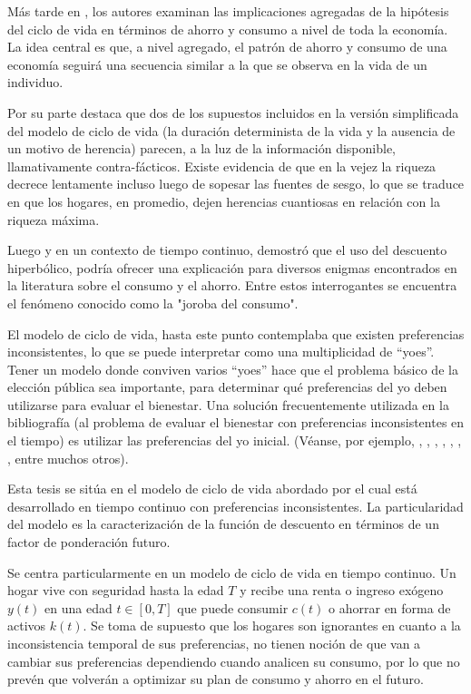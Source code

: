Más tarde en \parencite{ando1963life}, los autores examinan las implicaciones agregadas de la hipótesis del ciclo de vida en términos de ahorro y consumo a nivel de toda la economía. La idea central es que, a nivel agregado, el patrón de ahorro y consumo de una economía seguirá una secuencia similar a la que se observa en la vida de un individuo. 

Por su parte \textcite{modigliani86} destaca que dos de los supuestos incluidos en la versión simplificada del modelo de ciclo de vida (la duración determinista de la vida y la ausencia de un motivo de herencia) parecen, a la luz de la información disponible, llamativamente contra-fácticos. Existe evidencia de que en la vejez la riqueza decrece lentamente incluso luego de sopesar las fuentes de sesgo, lo que se traduce en que los hogares, en promedio, dejen herencias cuantiosas en relación con la riqueza máxima.

Luego y en un contexto de tiempo continuo,  \textcite{Laibson97}  demostró que el uso del descuento hiperbólico, podría ofrecer una explicación para diversos enigmas encontrados en la literatura sobre el consumo y el ahorro. Entre estos interrogantes se encuentra el fenómeno conocido como la "joroba del consumo".

El modelo de ciclo de vida, hasta este punto contemplaba que existen preferencias inconsistentes, lo que se puede interpretar como una multiplicidad de ``yoes''. Tener un modelo donde conviven varios ``yoes'' hace que el problema básico de la elección pública sea importante, para determinar   qué preferencias del yo deben utilizarse para evaluar el bienestar. Una solución frecuentemente utilizada en la bibliografía (al problema de evaluar el bienestar con preferencias inconsistentes en el tiempo) es utilizar las preferencias del yo inicial. (Véanse, por ejemplo, \parencite{Laibson96}, \parencite{Laibson97}, \parencite{Laibson98}, \parencite{Laibson98b}, \parencite{ODonoghue99}, \parencite{ODonoghue00}, \parencite{ODonoghue01}, entre muchos otros).

Esta tesis se sitúa en el modelo de ciclo de vida abordado por \textcite{feigenbaum2021deviation} el cual está desarrollado en tiempo continuo con preferencias inconsistentes. La particularidad del modelo es la caracterización de la función de descuento en términos de un factor de ponderación futuro.

Se centra particularmente en un modelo de ciclo de vida en tiempo continuo. Un hogar vive con seguridad hasta la edad $T$ y recibe una renta o ingreso exógeno $y(t)$ en una edad $t \in [0, T]$ que puede consumir $c(t)$ o ahorrar en forma de activos $k(t)$. Se toma de supuesto que los hogares son ignorantes en cuanto a la inconsistencia temporal de sus preferencias, no tienen noción de que van a cambiar sus preferencias dependiendo cuando analicen su consumo, por lo que no prevén que volverán a optimizar su plan de consumo y ahorro en el futuro.

